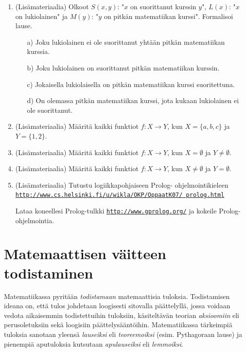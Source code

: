 \begin{enumerate}
\item (Lisämateriaalia) Olkoot $S(x,y)$: "$x$ on suorittanut
kurssin $y$", $L(x)$: "$x$ on lukiolainen" ja $M(y)$: "$y$ on
pitkän matematiikan kurssi". Formalisoi lause.
\begin{itemize}
\item[a)] Joku lukiolainen ei ole suorittanut yhtään pitkän
matematiikan kurssia.
\item[b)] Joku lukiolainen on suorittanut pitkän matematiikan
kurssin.
\item[c)] Jokaisella lukiolaisella on pitkän matematiikan kurssi
suoritettuna.
\item[d)] On olemassa pitkän matematiikan kurssi, jota kukaan
lukiolainen ei ole suorittanut.
\end{itemize}

\item (Lisämateriaalia) Määritä kaikki funktiot $f\colon X\to Y$,
kun $X=\{a,b,c\}$ ja $Y=\{1,2\}$.

\item (Lisämateriaalia) Määritä kaikki funktiot $f\colon X\to Y$,
kun $X=\emptyset$ ja $Y\neq \emptyset$.

\item (Lisämateriaalia) Määritä kaikki funktiot $f\colon X\to Y$,
kun $X\neq \emptyset$ ja $Y= \emptyset$.

\item (Lisämateriaalia) Tutustu logiikkapohjaiseen Prolog-
ohjelmointikieleen\\
\href{http://www.cs.helsinki.fi/u/wikla/OKP/OppaatK07/
prolog.html}
{{\tt http://www.cs.helsinki.fi/u/wikla/OKP/OppaatK07/
prolog.html}}

Lataa koneellesi Prolog-tulkki \href{http://www.gprolog.org/}
{{\tt http://www.gprolog.org/}}
ja kokeile Prolog-ohjelmointia.

\end{enumerate}

\newpage

\chapter{Matemaattisen väitteen todistaminen}

Matematiikassa pyritään {\em todistamaan} matemaattisia tuloksia. Todistamisen ideana on, että tulos johdetaan loogisesti sitovalla päättelyllä, jossa voidaan vedota aikaisemmin todistettuihin tuloksiin, käsiteltävän teorian {\em aksioomiin} eli perusoletuksiin sekä loogisiin päättelysääntöihin. Matematiikassa tärkeimpiä tuloksia sanotaan yleensä {\em lauseiksi} eli {\em teoreemoiksi} (esim. Pythagoraan lause) ja pienempiä aputuloksia kutsutaan {\em apulauseiksi} eli {\em lemmoiksi}.

